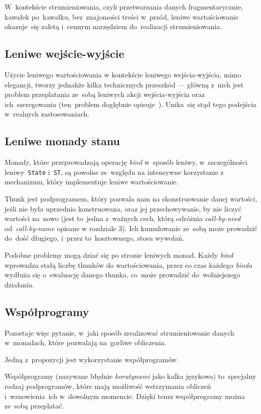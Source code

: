 \documentclass[../../praca.tex]{subfiles}
\begin{document}
W~kontekście strumieniowania, czyli przetwarzania danych fragmentarycznie,
kawałek po~kawałku, bez~znajomości treści w~przód, leniwe wartościowanie okazuje~się
zaletą i~cennym narzędziem do~realizacji strumieniowania.

\subsection{Leniwe wejście-wyjście}

Użycie leniwego wartościowania w kontekście leniwego wejścia-wyjścia,
mimo elegancji, tworzy jednakże kilka technicznych przeszkód --- główną z~nich
jest problem przeplatania ze~sobą leniwych akcji wejścia-wyjścia oraz ich~szeregowania
(ten~problem dogłębnie opisuje~\cite{Thomasson:HHPP}). Unika~się stąd tego podejścia
w~realnych zastosowaniach.

\subsection{Leniwe monady stanu}

Monady, które przeprowadzają operację \emph{bind} w~sposób leniwy,
w~szczególności leniwy~\texttt{State} i~\texttt{ST}, są powolne ze~względu
na intensywne korzystanie z mechanizmu, który implementuje leniwe wartościowanie.

Thunk jest podprogramem, który pozwala nam na skonstruowanie danej wartości,
jeśli nie była uprzednio konstruowana, oraz jej przechowywanie, by nie
liczyć wartości na~nowo (jest to~jedna z~ważnych cech, którą odróżnia \emph{call-by-need}
od~\emph{call-by-name} opisane w rozdziale 3). 
Ich kumulowanie ze~sobą może prowadzić do~dość długiego,
i~przez to~kosztownego, stosu wywołań. 

Podobne problemy mogą dziać się po stronie leniwych monad. Każdy \emph{bind}
wprowadza stałą liczbę thunków do wartościowania, przez co czas każdego \emph{binda}
wydłuża się o~ewaluację danego thunka, co~może prowadzić do~wolniejszego działania.

\subsection{Współprogramy}

Pozostaje więc pytanie, w~jaki sposób zrealizować strumieniowanie danych
w~monadach, które pozwalają na~gorliwe obliczenia.

Jedną z~propozycji jest wykorzystanie współprogramów.

Współprogramy (nazywane błędnie \emph{korutynami} jako kalka językowa)
to~specjalny rodzaj podprogramów, które mają możliwość wstrzymania obliczeń
i~wznowienia~ich w~dowolnym momencie. Dzięki temu współprogramy można ze~sobą
przeplatać.
\end{document}
